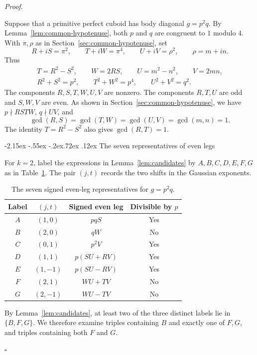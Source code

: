 \documentclass[11pt,a4paper,twoside]{article}
\makeatletter
\numberwithin{equation}{section}
\newcommand{\proseheadingstop}{.}
\providecommand{\proofname}{Proof}
\renewcommand{\subsection}{\@startsection{subsection}{2}{\z@}%
  {-2.15ex \@plus -.55ex \@minus -.2ex}{.72ex \@plus .12ex}%
  {\normalfont\normalsize\bfseries}}
\newenvironment{proof}[1][\proofname]{%
  \par\addvspace{.65\baselineskip}\noindent
  \textit{#1}\proseheadingstop\enspace\ignorespaces
}{%
  \unskip\nobreak\hfill\nobreak\(\square\)\par
  \addvspace{.65\baselineskip}
}
\makeatother
\begin{document}
\begin{proof}

Suppose that a primitive perfect cuboid has body diagonal \(g=p^2q\).
By Lemma~\ref{lem:common-hypotenuse}, both \(p\) and \(q\) are congruent to \(1\) modulo \(4\).
With \(\pi,\rho\) as in Section~\ref{sec:common-hypotenuse}, set
\[
R+iS=\pi^2,\qquad T+iW=\pi^4,\qquad U+iV=\rho^2,
\qquad \rho=m+in.
\]
Thus
\[
\begin{gathered}
T=R^2-S^2,\qquad W=2RS,\qquad U=m^2-n^2,\qquad V=2mn,\\
R^2+S^2=p^2,\qquad T^2+W^2=p^4,\qquad U^2+V^2=q^2.
\end{gathered}
\]
The components \(R,S,T,W,U,V\) are nonzero. The components \(R,T,U\)
are odd and \(S,W,V\) are even. As shown in Section~\ref{sec:common-hypotenuse}, we have
\(p\nmid RSTW\), \(q\nmid UV\), and
\[
\gcd(R,S)=\gcd(T,W)=\gcd(U,V)=\gcd(m,n)=1.
\]
The identity \(T=R^2-S^2\) also gives \(\gcd(R,T)=1\).

\subsection{The seven representatives of even legs}

For \(k=2\), label the expressions in Lemma~\ref{lem:candidates} by \(A,B,C,D,E,F,G\)
as in Table~\ref{tab:p2q}. The pair \((j,t)\) records the two shifts in the Gaussian
exponents.
\begin{table}[htbp]
\centering
\renewcommand{\arraystretch}{1.2}
\begin{tabular}{@{}cccc@{}}
\toprule
Label & \((j,t)\) & Signed even leg & Divisible by \(p\) \\
\midrule
\(A\) & \((1,0)\) & \(pqS\) & Yes \\
\(B\) & \((2,0)\) & \(qW\) & No \\
\(C\) & \((0,1)\) & \(p^2V\) & Yes \\
\(D\) & \((1,1)\) & \(p(SU+RV)\) & Yes \\
\(E\) & \((1,-1)\) & \(p(SU-RV)\) & Yes \\
\(F\) & \((2,1)\) & \(WU+TV\) & No \\
\(G\) & \((2,-1)\) & \(WU-TV\) & No \\
\bottomrule
\end{tabular}
\caption{The seven signed even-leg representatives for \(g=p^2q\).}
\label{tab:p2q}
\end{table}
By Lemma~\ref{lem:candidates}, at least two of the three distinct labels lie in
\(\{B,F,G\}\). We therefore examine triples containing \(B\) and exactly
one of \(F,G\), and triples containing both \(F\) and \(G\).


\end{proof}
\end{document}

